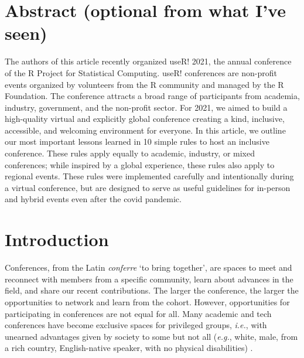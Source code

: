 \documentclass[10pt,letterpaper]{article}
\begin{document}
\section*{Abstract (optional from what I've seen)}

The authors of this article recently organized useR! 2021, the annual conference of the R Project for Statistical Computing. useR! conferences are non-profit events organized by volunteers from the R community and managed by the R Foundation. The conference attracts a broad range of participants from academia, industry, government, and the non-profit sector. For 2021, we aimed to build a high-quality virtual and explicitly global conference creating a kind, inclusive, accessible, and welcoming environment for everyone. 
In this article, we outline our most important lessons learned in 10 simple rules to host an inclusive conference. These rules apply equally to academic, industry, or mixed conferences; while inspired by a global experience, these rules also apply to regional events. These rules were implemented carefully and intentionally during a virtual conference, but are designed to serve as useful guidelines for in-person and hybrid events even after the covid pandemic. 


\linenumbers

\section*{Introduction}

Conferences, from the Latin \textit{conferre} `to bring together', are spaces to meet and reconnect with members from a specific community, learn about advances in the field, and share our recent contributions.
The larger the conference, the larger the opportunities to network and learn from the cohort.
However, opportunities for participating in conferences are not equal for all. 
Many academic and tech conferences have become exclusive spaces for privileged groups, \textit{i.e.}, with unearned advantages given by society to some but not all (\textit{e.g.}, white, male, from a rich country, English-native speaker, with no physical disabilities) \cite{arendDisparityConferenceRegistration2019, biggsAcademicConferenceChilly2018, depickerRethinkingInclusionDisability2020a, irishIncreasingParticipationUsing2020}.
\end{document}
